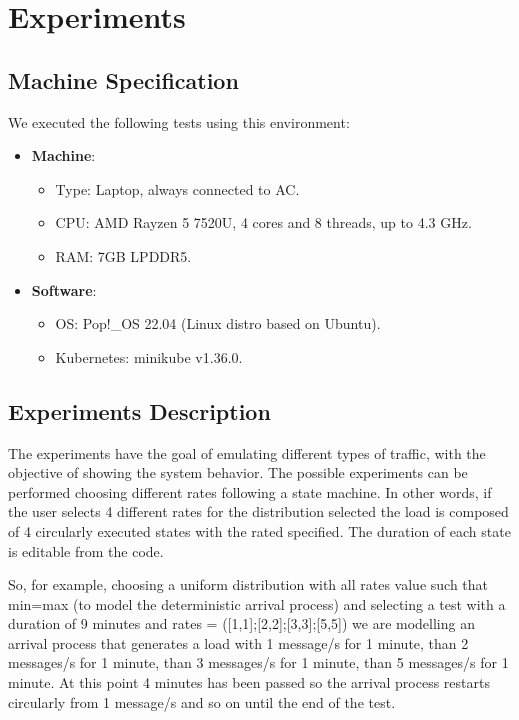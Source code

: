\section{Experiments}

\subsection{Machine Specification}
We executed the following tests using this environment:
\begin{itemize}
    \item \textbf{Machine}:
    \begin{itemize}
        \item Type: Laptop, always connected to AC.
        \item CPU: AMD Rayzen 5 7520U, 4 cores and 8 threads, up to 4.3 GHz.
        \item RAM: 7GB LPDDR5.
    \end{itemize}
    \item \textbf{Software}:
    \begin{itemize}
        \item OS: Pop!\_OS 22.04 (Linux distro based on Ubuntu).
        \item Kubernetes: minikube v1.36.0.
    \end{itemize}
\end{itemize}

\subsection{Experiments Description}
The experiments have the goal of emulating different types of traffic, with the objective of showing the system behavior. The possible experiments can be performed choosing different rates following a state machine. In other words, if the user selects 4 different rates for the distribution selected the load is composed of 4 circularly executed states with the rated specified. The duration of each state is editable from the code.


So, for example, choosing a uniform distribution with all rates value such that min=max (to model the deterministic arrival process) and selecting a test with a duration of 9 minutes and rates = ([1,1];[2,2];[3,3];[5,5]) we are modelling an arrival process that generates a load with 1 message/s for 1 minute, than 2 messages/s for 1 minute, than 3 messages/s for 1 minute, than 5 messages/s for 1 minute. At this point 4 minutes has been passed so the arrival process restarts circularly from 1 message/s and so on until the end of the test.

